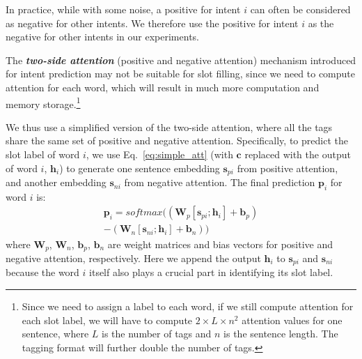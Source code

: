 In practice, while with some noise, a positive \RE for intent $i$ can often be considered as negative \REs for other intents.
We therefore use the positive \REs for intent $i$ as the negative \REs for other intents in our experiments.

The \textbf{\emph{two-side attention}} (positive and negative attention) mechanism introduced for intent prediction
may not be suitable for slot filling, since we need to compute attention for each word, which will result in much more
computation and memory storage.\footnote{Since we need to assign a label to each word, if we still compute attention for each slot label, we
will have to compute $2\times L \times n^2$ attention values for one sentence, where $L$ is the number of tags and $n$ is the sentence
length. The \BIO tagging format will further double the number of tags.}

We thus use a simplified version of the two-side attention, where all the tags share the same set of positive and negative attention.
Specifically, to predict the slot label of word $i$, we use Eq.~\ref{eq:simple_att} (with $\textbf{c}$ replaced with the \BLSTM output of word $i$, $\textbf{h}_i$) to generate one sentence embedding $\textbf{s}_{pi}$ from positive attention, and another embedding $\textbf{s}_{ni}$ from negative attention.
The final prediction $\textbf{p}_i$ for word $i$ is:
\begin{equation}
\begin{split}
\textbf{p}_i = softmax((\textbf{W}_p [\textbf{s}_{pi}; \textbf{h}_i] + \textbf{b}_p) \\- (\textbf{W}_n [\textbf{s}_{ni}; \textbf{h}_i] + \textbf{b}_n))
\end{split}
\end{equation}
where $\textbf{W}_{p}$, $\textbf{W}_{n}$, $\textbf{b}_{p}$, $\textbf{b}_{n}$ are weight matrices and bias vectors for positive and negative attention, respectively. Here we append the \BLSTM output $\textbf{h}_i$ to $\textbf{s}_{pi}$ and $\textbf{s}_{ni}$ because the word $i$ itself also plays a crucial part in identifying its slot label.

